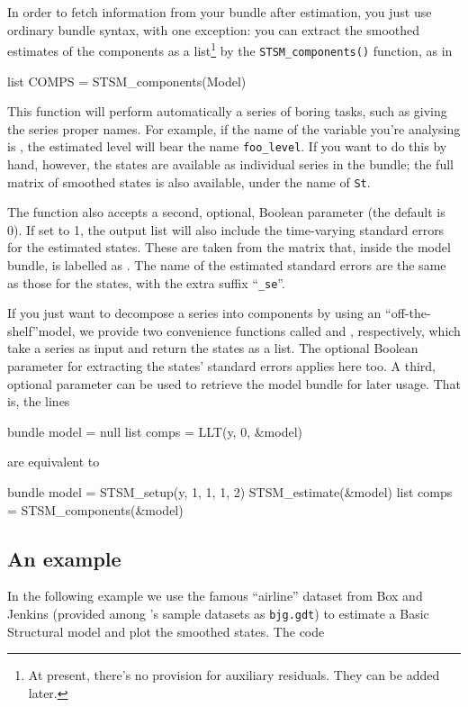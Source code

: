 \documentclass[a4paper,10pt]{article}
\begin{document}
In order to fetch information from your bundle after estimation, you
just use ordinary bundle syntax, with one exception: you can extract
the smoothed estimates of the components as a list\footnote{At
  present, there's no provision for auxiliary residuals. They can be
  added later.}  by the \texttt{STSM\_components()} function, as in
\begin{code}
  list COMPS = STSM_components(Model)
\end{code}
This function will perform automatically a series of boring tasks,
such as giving the series proper names. For example, if the name of
the variable you're analysing is , the estimated level will
bear the name \verb|foo_level|. If you want to do this by
hand, however, the states are available as individual series in the
bundle; the full matrix of smoothed states is also available, under
the name of \texttt{St}.

The function  also accepts a second, optional,
Boolean parameter (the default is 0). If set to 1, the output list
will also include the time-varying standard errors for the estimated
states. These are taken from the matrix that, inside the model bundle,
is labelled as . The name of the estimated standard errors
are the same as those for the states, with the extra suffix ``\verb|_se|''. 

If you just want to decompose a series into components by using an
``off-the-shelf''model, we provide two convenience functions called
 and , respectively, which take a series as input
and return the states as a list. The optional Boolean parameter for
extracting the states' standard errors applies here too. A third,
optional parameter can be used to retrieve the model bundle for later
usage. That is, the lines
\begin{code}
  bundle model = null
  list comps = LLT(y, 0, &model)
\end{code}
are equivalent to
\begin{code}
  bundle model = STSM_setup(y, 1, 1, 1, 2)
  STSM_estimate(&model)
  list comps = STSM_components(&model)
\end{code}

\subsection{An example}

In the following example we use the famous ``airline'' dataset from
Box and Jenkins (provided among 's sample datasets as
\verb|bjg.gdt|) to estimate a Basic Structural model and plot the
smoothed states. The code
\end{document}
